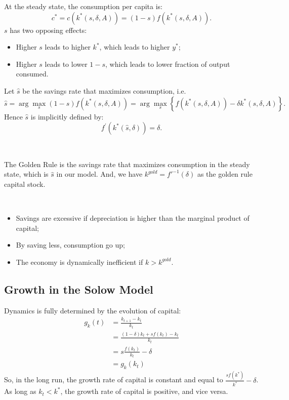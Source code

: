 At the steady state, the consumption per capita is:
\[c^* = c(k^*(s, \delta, A)) = (1-s) f(k^*(s, \delta, A)).\]
$s$ has two opposing effects:
\begin{itemize}
    \item Higher $s$ leads to higher $k^*$, which leads to higher $y^*$;
    \item Higher $s$ leads to lower $1-s$, which leads to lower fraction of output consumed.
\end{itemize}

Let $\hat{s}$ be the savings rate that maximizes consumption, i.e.
\[\hat{s} = \arg \max_s (1-s)f(k^*(s, \delta, A)) = \arg \max_{s} \left\{f(k^*(s, \delta, A)) - \delta k^*(s, \delta, A)\right\}.\]
Hence $\hat{s}$ is implicitly defined by:
\[f^{\prime} (k^*(\hat{s}, \delta)) = \delta. \]

\begin{definition}\label{Golden Rule}
    \

    The Golden Rule is the savings rate that maximizes consumption in the steady state,
    which is $\hat{s}$ in our model. And, we have $k^{gold} = f'^{-1}(\delta)$ as
    the golden rule capital stock.

    \begin{note}
        \ 

        \begin{itemize}
            \item Savings are excessive if depreciation is higher than the marginal
            product of capital;
            \item By saving less, consumption go up;
            \item The economy is dynamically inefficient if $k>k^{gold}$.
        \end{itemize}
    \end{note}
\end{definition}

\subsection{Growth in the Solow Model}

Dynamics is fully determined by the evolution of capital:
\begin{align*}
    g_k(t) &= \frac{k_{t+1} - k_t}{k_t}\\
    &= \frac{(1-\delta)k_t + sf(k_t) - k_t}{k_t}\\
    &= s\frac{f(k_t)}{k_t}-\delta\\
    &= g_k(k_t)
\end{align*}
So, in the long run, the growth rate of capital is constant and equal to $\frac{sf(k^*)}{k^*} - \delta$.
As long as $k_t<k^*$, the growth rate of capital is positive, and vice versa.

